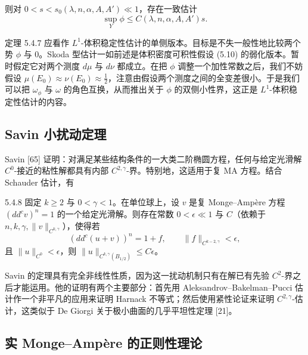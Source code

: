 则对 $0<s<s_0(\lambda,n,\alpha,A,A')\ll1$，存在一致估计
\[
\sup_Y\phi\le C(\lambda,n,\alpha,A,A')s.
\]

定理 5.4.7 应看作 $L^1$-体积稳定性估计的单侧版本。目标是不失一般性地比较两个势 $\phi$ 与 $0$。Skoda 型估计一如前述是体积密度可积性假设 (5.10) 的弱化版本。暂时假定它对两个测度 $d\mu$ 与 $d\nu$ 都成立。在把 $\phi$ 调整一个加性常数之后，我们不妨假设 $\mu(E_0)\approx\nu(E_0)\approx\frac12$，注意由假设两个测度之间的全变差很小。于是我们可以把 $\omega_\phi$ 与 $\omega$ 的角色互换，从而推出关于 $\phi$ 的双侧小性界，这正是 $L^1$-体积稳定性估计的内容。


\subsection{Savin 小扰动定理}

Savin [65] 证明：对满足某些结构条件的一大类二阶椭圆方程，任何与给定光滑解 $C^0$-接近的粘性解都具有内部 $C^{2,\gamma}$-界。特别地，这适用于复 MA 方程。结合 Schauder 估计，有

\begin{theorem}{5.4.8}
固定 $k\ge2$ 与 $0<\gamma<1$。在单位球上，设 $v$ 是复 Monge--Ampère 方程 $(dd^cv)^n=1$ 的一个给定光滑解。则存在常数 $0<\epsilon\ll1$ 与 $C$（依赖于 $n,k,\gamma,\|v\|_{C^{k,\gamma}}$），使得若
\[
(dd^c(u+v))^n=1+f,\qquad \|f\|_{C^{k-2,\gamma}}<\epsilon,
\]
且 $\|u\|_{C^0}<\epsilon$，则 $\|u\|_{C^{k,\gamma}(B_{1/2})}\le C\epsilon$。
\end{theorem}


Savin 的定理具有完全非线性性质，因为这一扰动机制只有在解已有先验 $C^2$-界之后才能运用。他的证明有两个主要部分：首先用 Aleksandrov--Bakelman--Pucci 估计作一个非平凡的应用来证明 Harnack 不等式；然后使用紧性论证来证明 $C^{2,\gamma}$-估计，这类似于 De Giorgi 关于极小曲面的几乎平坦性定理 [21]。

\subsection{实 Monge--Ampère 的正则性理论}

